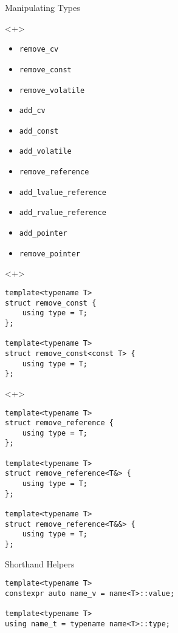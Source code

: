 \documentclass[table]{beamer}
\begin{document}
\begin{frame}[fragile]{Manipulating Types}
  \begin{onlyenv}<+>
    \begin{itemize}
    \item \texttt{remove\_cv}
    \item \texttt{remove\_const}
    \item \texttt{remove\_volatile}
    \item \texttt{add\_cv}
    \item \texttt{add\_const}
    \item \texttt{add\_volatile}
    \item \texttt{remove\_reference}
    \item \texttt{add\_lvalue\_reference}
    \item \texttt{add\_rvalue\_reference}
    \item \texttt{add\_pointer}
    \item \texttt{remove\_pointer}
    \end{itemize}
  \end{onlyenv}

  \begin{onlyenv}<+>
    \begin{verbatim}
template<typename T>
struct remove_const {
    using type = T;
};

template<typename T>
struct remove_const<const T> {
    using type = T;
};
    \end{verbatim}
  \end{onlyenv}

  \begin{onlyenv}<+>
\begin{verbatim}
template<typename T>
struct remove_reference {
    using type = T;
};

template<typename T>
struct remove_reference<T&> {
    using type = T;
};

template<typename T>
struct remove_reference<T&&> {
    using type = T;
};
    \end{verbatim}
  \end{onlyenv}
\end{frame}

\begin{frame}[fragile]{Shorthand Helpers}
  \begin{verbatim}
template<typename T>
constexpr auto name_v = name<T>::value;

template<typename T>
using name_t = typename name<T>::type;
  \end{verbatim}
\end{frame}
\end{document}
